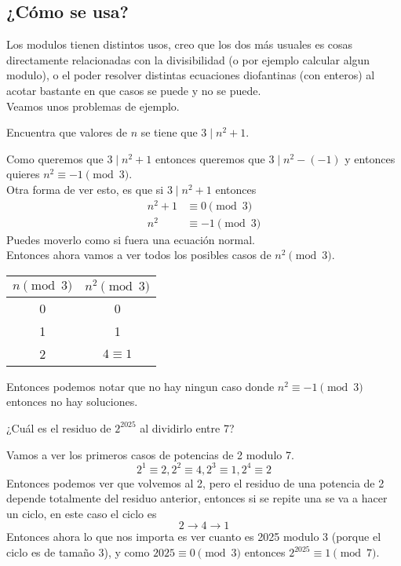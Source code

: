 \documentclass[11pt]{scrartcl}
\begin{document}
\subsection{¿C\'omo se usa?}
Los modulos tienen distintos usos, creo que los dos m\'as usuales es cosas directamente relacionadas con la divisibilidad (o por ejemplo calcular algun modulo), o el poder resolver distintas ecuaciones diofantinas (con enteros) al acotar bastante en que casos se puede y no se puede. \\
Veamos unos problemas de ejemplo. 

\begin{example} 
Encuentra que valores de $n$ se tiene que $3 \mid n^2+1$.
\end{example}

\begin{soln}
Como queremos que $3 \mid n^2+1$ entonces queremos que $3 \mid n^2-(-1)$ y entonces quieres $n^2 \equiv -1 \pmod 3$.  \\
Otra forma de ver esto, es que si $3 \mid n^2+1$ entonces
\begin{align*}
n^2+1 &\equiv 0 \pmod 3 \\
n^2 &\equiv -1 \pmod 3
\end{align*}
Puedes moverlo como si fuera una ecuaci\'on normal. \\

Entonces ahora vamos a ver todos los posibles casos de $n^2 \pmod 3$. 
\begin{center}
\begin{tabular}{|c|c|}
\hline
$n \pmod 3$ &  $n^2\pmod 3$\\
\hline
0 &  0 \\
\hline
1 &  1\\
\hline
2 &  $ 4 \equiv 1 $\\
\hline
\end{tabular}
\end{center}

Entonces podemos notar que no hay ningun caso donde $n^2 \equiv -1 \pmod 3$ entonces no hay soluciones. \\
\end{soln}
\begin{example}
¿Cu\'al es el residuo de $2^{2025}$ al dividirlo entre 7?
\end{example}

\begin{soln}
Vamos a ver los primeros casos de potencias de 2 modulo 7. \\
\[2^1 \equiv 2, 2^2 \equiv 4, 2^3 \equiv 1, 2^4 \equiv 2\]
Entonces podemos ver que volvemos al 2, pero el residuo de una potencia de 2 depende totalmente del residuo anterior, entonces si se repite una se va a hacer un ciclo, en este caso el ciclo es
\[2 \rightarrow 4 \rightarrow 1 \]
Entonces ahora lo que nos importa es ver cuanto es 2025 modulo 3 (porque el ciclo es de tamaño 3), y como $2025 \equiv 0 \pmod 3$ entonces $2^{2025} \equiv 1 \pmod 7$.
\end{soln}
\end{document}
